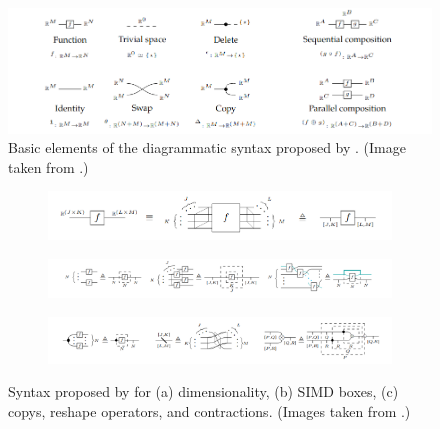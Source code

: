 \documentclass[11pt,a4paper,openright,twoside]{report}
\theoremstyle{plain}
\theoremstyle{definition}
\begin{document}
\begin{figure}[h]
  \begin{center}
    \includegraphics[width=\textwidth]{figures/khatri_diagrams.png}
    \caption[Diagrammatic syntax of \cite{khatri2024anatomy}]{Basic elements of the diagrammatic syntax proposed by \cite{khatri2024anatomy}. (Image taken from \cite{khatri2024anatomy}.)}
    \label{fig: khatribasicdiagrams}
  \end{center}
\end{figure}

\begin{figure}[h]
  \begin{center}
    \begin{subfigure}{0.7\textwidth}
      \includegraphics[width=\textwidth]{figures/khatri_labels2.png}
      \caption{}
    \end{subfigure}  
    \begin{subfigure}{0.9\textwidth}
      \includegraphics[width=\textwidth]{figures/khatri_simd1.png}
      \caption{}
    \end{subfigure}    
    \begin{subfigure}{0.9\textwidth}
      \includegraphics[width=\textwidth]{figures/khatri_simd2.png}
      \caption{}
    \end{subfigure}    
    \caption[Dimensionality, SIMD boxes, and syntactic sugar]{Syntax proposed by \cite{khatri2024anatomy} for (a) dimensionality, (b) SIMD boxes, (c) copys, reshape operators, and contractions. (Images taken from \cite{khatri2024anatomy}.)}
    \label{fig: khatridiagrams}
  \end{center}
\end{figure}
\end{document}
